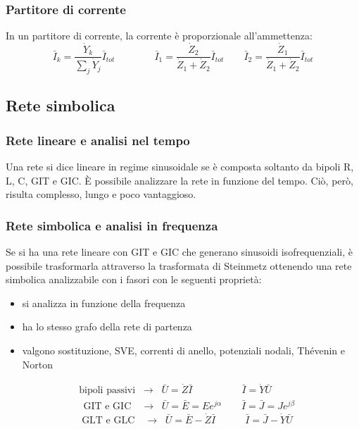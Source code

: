 \documentclass[a4paper]{article}
\begin{document}
\subsubsection*{Partitore di corrente}
In un partitore di corrente, la corrente è proporzionale all'ammettenza:
\[\bar{I}_k = \frac{\dot{Y}_k}{\sum_j \dot{Y}_j} \bar{I}_{tot} \qquad\qquad \bar{I}_1 = \frac{\dot{Z}_2}{\dot{Z}_1 + \dot{Z}_2} \bar{I}_{tot} \qquad \bar{I}_2 = \frac{\dot{Z}_1}{\dot{Z}_1 + \dot{Z}_2} \bar{I}_{tot}\]

\subsection{Rete simbolica}
\subsubsection*{Rete lineare e analisi nel tempo}
Una rete si dice lineare in regime sinusoidale se è composta soltanto da bipoli R, L, C, GIT e GIC. È possibile analizzare la
rete in funzione del tempo. Ciò, però, risulta complesso, lungo e poco vantaggioso.

\subsubsection*{Rete simbolica e analisi in frequenza}
Se si ha una rete lineare con GIT e GIC che generano sinusoidi isofrequenziali, è possibile trasformarla attraverso la trasformata
di Steinmetz ottenendo una rete simbolica analizzabile con i fasori con le seguenti proprietà:
\begin{itemize}
	\item si analizza in funzione della frequenza
	\item ha lo stesso grafo della rete di partenza
	\item valgono sostituzione, SVE, correnti di anello, potenziali nodali, Thévenin e Norton
\end{itemize}

\begin{align*}
	&\text{bipoli passivi} \;\; \rightarrow \;\; \bar{U} = \dot{Z} \bar{I} \qquad\qquad\quad \bar{I} = \dot{Y} \bar{U} \\
	&\;\, \text{GIT e GIC} \quad \rightarrow \;\; \bar{U} = \bar{E} = Ee^{j\alpha} \qquad \bar{I} = \bar{J} = Je^{j\beta} \\
	&\;\text{GLT e GLC} \!\!\quad \rightarrow \;\; \bar{U} = \bar{E} - \dot{Z} \bar{I} \qquad\quad \bar{I} = \bar{J} - \dot{Y} \bar{U}
\end{align*}
\end{document}
